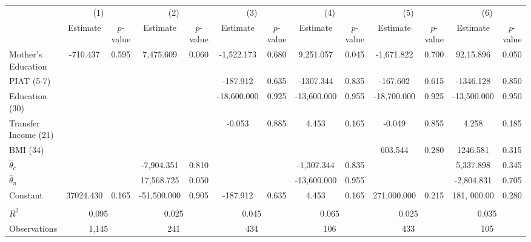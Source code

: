 \begin{tabular}{lcccccccccccc} \toprule
 & \multicolumn{2}{c}{(1)}  &  \multicolumn{2}{c}{(2)}  &  \multicolumn{2}{c}{(3)}  &  \multicolumn{2}{c}{(4)}  & \multicolumn{2}{c}{(5)} & \multicolumn{2}{c}{(6)} \\  
 & Estimate & $p$-value & Estimate & $p$-value & Estimate & $p$-value & Estimate & $p$-value & Estimate & $p$-value & Estimate & $p$-value \\ \midrule
Mother's Education &  -710.437 &     0.595 &  7,475.609 &     0.060 & -1,522.173 &     0.680 &  9,251.057 &     0.045 & -1,671.822 &     0.700 &  92,15.896 &     0.050 \\  
PIAT (5-7) &         &        &        &        & -187.912 &     0.635 & -1307.344 &     0.835 &  -167.602 &     0.615 & -1346.128 &     0.850 \\  
Education (30) &         &        &        &        &-18,600.000 &     0.925 & -13,600.000 &     0.955 & -18,700.000 &     0.925 & -13,500.000 &     0.950 \\  
Transfer Income (21) &         &        &        &        &   -0.053 &     0.885 &     4.453 &     0.165 &    -0.049 &     0.855 &     4.258 &     0.185 \\  
BMI (34) &         &        &        &        &        &        &        &        &  603.544 &     0.280 &  1246.581 &     0.315 \\  
$\hat{\theta}_{c}$ &         &        &-7,904.351 &     0.810 &         &        &-1,307.344 &     0.835 &         &        & 5,337.898 &     0.345 \\  
$\hat{\theta}_{n}$ &         &        &17,568.725 &     0.050 &         &        &-13,600.000 &     0.955 &         &        &-2,804.831 &     0.705 \\  
Constant & 37024.430 &     0.165 & -51,500.000 &     0.905 &  -187.912 &     0.635 &     4.453 &     0.165 &  271,000.000 &     0.215 &  181, 000.00 &     0.280 \\ \\ \midrule
$R^2$ &     \multicolumn{2}{c}{0.095} & \multicolumn{2}{c}{0.025} &  \multicolumn{2}{c}{0.045} &  \multicolumn{2}{c}{0.065} &     \multicolumn{2}{c}{0.025} & \multicolumn{2}{c}{0.035} \\  
Observations  &  \multicolumn{2}{c}{1,145} &   \multicolumn{2}{c}{241} & \multicolumn{2}{c}{434} & \multicolumn{2}{c}{106} & \multicolumn{2}{c}{433} & \multicolumn{2}{c}{105} \\  
\bottomrule \end{tabular}
